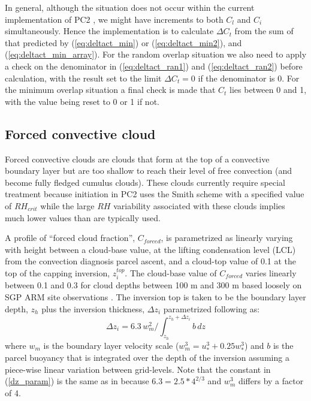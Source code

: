 \documentclass{UMDP_article}
\begin{document}
In general, although the situation does not occur within the current
implementation of PC2 , we might have increments to both $C_l$ and
$C_i$ simultaneously. Hence the implementation is to calculate
$\Delta C_t$ from the sum of that predicted by (\ref{eq:deltact_min})
or (\ref{eq:deltact_min2}), and (\ref{eq:deltact_min_array}).
For the random overlap situation we also need to apply a check on
the denominator in (\ref{eq:deltact_ran1}) and (\ref{eq:deltact_ran2}) before
calculation, with the result set to the limit $\Delta C_t = 0$
if the denominator is 0. For the minimum overlap situation a final check
is made that $C_t$ lies between 0 and 1, with the value being reset to
0 or 1 if not.

\subsection{Forced convective cloud}

Forced convective clouds are clouds that form at the top of a convective boundary layer 
but are too shallow to reach their level of free convection (and become fully fledged 
cumulus clouds).  These clouds currently require special treatment because initiation 
in PC2 uses the Smith scheme with a specified value of $RH_{crit}$ while the large $RH$ 
variability associated with these clouds implies much lower values than are typically used.  

A profile of ``forced cloud fraction'', $C_{forced}$, is parametrized as
linearly varying with height between a cloud-base value, at the lifting
condensation level (LCL) from the convection diagnosis parcel ascent, and a cloud-top
value of 0.1 at the top of the capping inversion, $z_i^{top}$.  The cloud-base
value of $C_{forced}$ varies linearly between 0.1 and 0.3 for cloud depths
between 100 m and 300 m based loosely on SGP ARM site observations \cite{zk13}.  The 
inversion top is taken to be the boundary layer depth, $z_h$ plus the inversion 
thickness, $\Delta z_i$ parametrized following \cite{rb08} as:
\begin{equation}
\Delta z_i  = 6.3 \, w_m^2 /  \int_{z_h}^{z_h+\Delta z_i} b \, dz 
\label{dz_param}
\end{equation}
where $w_m$ is the boundary layer velocity scale ($w_m^3 = u_*^3 + 0.25 w_*^3$) and $b$ is 
the parcel buoyancy that is integrated over the depth of the inversion assuming a 
piece-wise linear variation between grid-levels.  Note that the constant in (\ref{dz_param}) 
is the same as in \cite{rb08} because $6.3 = 2.5 * 4^{2/3}$ and $w_m^3$ differs by a factor of 4.
\end{document}
